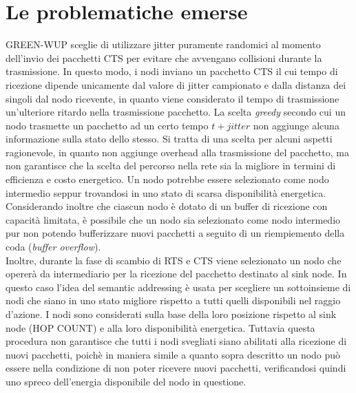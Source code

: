 \documentclass{report}
\begin{document}
\section{Le problematiche emerse}

GREEN-WUP sceglie di utilizzare jitter puramente randomici al momento dell'invio dei pacchetti CTS per evitare che avvengano collisioni durante
la trasmissione. In questo modo, i nodi inviano un pacchetto CTS il cui tempo di ricezione dipende unicamente dal valore di jitter
campionato e dalla distanza dei singoli dal nodo ricevente, in quanto viene considerato il tempo di trasmissione un'ulteriore ritardo nella
trasmissione pacchetto. La scelta \emph{greedy} secondo cui un nodo trasmette un pacchetto ad un certo tempo $t+jitter$ non aggiunge alcuna
informazione sulla stato dello stesso. Si tratta di una scelta per alcuni aspetti ragionevole, in quanto non aggiunge overhead alla trasmissione
del pacchetto, ma non garantisce che la scelta del percorso nella rete sia la migliore in termini di efficienza e costo energetico. Un nodo
potrebbe essere selezionato come nodo intermedio seppur trovandosi in uno stato di scarsa disponibilità energetica. Considerando inoltre che 
ciascun nodo è dotato di un buffer di ricezione con capacità limitata, è possibile che un nodo sia selezionato come nodo intermedio pur non 
potendo bufferizzare nuovi pacchetti a seguito di un riempiemento della coda (\emph{buffer overflow}).\\

Inoltre, durante la fase di scambio di RTS e CTS viene selezionato un nodo che opererà da intermediario per la ricezione del pacchetto destinato
al sink node. In questo caso l'idea del semantic addressing è usata per scegliere un sottoinsieme di nodi che siano in uno stato migliore 
rispetto a tutti quelli disponibili nel raggio d'azione. I nodi sono considerati sulla base della loro posizione rispetto al
sink node (HOP COUNT) e alla loro disponibilità energetica. Tuttavia questa procedura non garantisce che tutti i nodi svegliati siano abilitati
alla ricezione di nuovi pacchetti, poichè in maniera simile a quanto sopra descritto un nodo può essere nella condizione di non poter
ricevere nuovi pacchetti, verificandosi quindi uno spreco dell'energia disponibile del nodo in questione.\\
\end{document}
